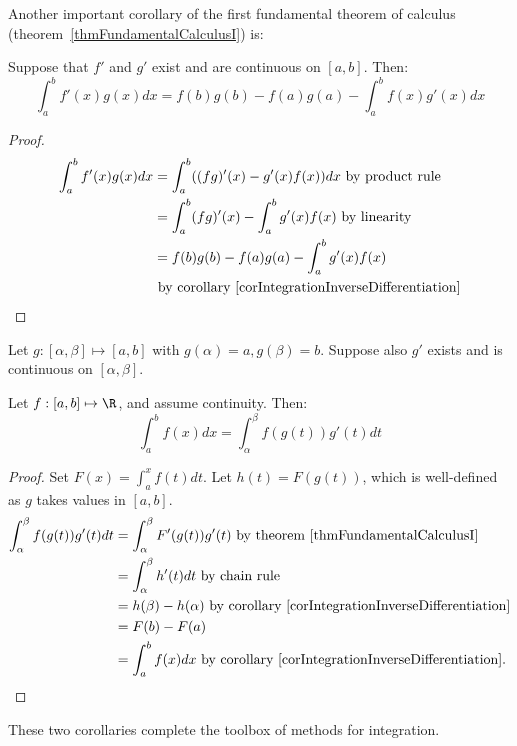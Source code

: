 \documentclass[../Main.tex]{subfiles}
\begin{document}
Another important corollary of the first fundamental theorem of calculus (theorem~\ref{thmFundamentalCalculusI}) is:
\begin{corollary}
    Suppose that $f'$ and $g'$ exist and are continuous on $[a, b]$. Then:
    \begin{equation*}
        \int_a^b f'(x) g(x) dx = f(b) g(b) - f(a) g(a) - \int_a^b f(x) g'(x) dx
    \end{equation*}
    \label{corIntegrationParts}
\end{corollary}
\begin{proof}
    \begin{align*}
        \int_a^b f'(x) g(x) dx &= \int_a^b ((fg)'(x) - g'(x) f(x))dx \text{ by product rule} \\
        &= \int_a^b (fg)'(x) - \int_a^b g'(x) f(x) \text{ by linearity} \\
        &= f(b) g(b) - f(a) g(a) - \int_a^b g'(x) f(x)\\
        &\text{ by corollary~\ref{corIntegrationInverseDifferentiation}}
    \end{align*}
\end{proof}
\begin{corollary}
    Let $g : [\alpha, \beta] \mapsto [a, b]$ with $g(\alpha) = a, g(\beta) = b$. Suppose also $g'$ exists and is continuous on $[\alpha, \beta]$.

    Let $f : [a, b] \mapsto \R$, and assume continuity. Then:
    \begin{equation*}
        \int_a^b f(x) dx = \int_\alpha^\beta f(g(t))g'(t) dt
    \end{equation*}
\end{corollary}
\begin{proof}
    Set $F(x) = \int_a^x f(t) dt$. Let $h(t) = F(g(t))$, which is well-defined as $g$ takes values in $[a, b]$.
    \begin{align*}
        \int_\alpha^\beta f(g(t)) g'(t) dt &= \int_\alpha^\beta F'(g(t)) g'(t) \text{ by theorem~\ref{thmFundamentalCalculusI}} \\
        &= \int_\alpha^\beta h'(t) dt \text{ by chain rule} \\
        &= h(\beta) - h(\alpha) \text{ by corollary~\ref{corIntegrationInverseDifferentiation}} \\
        &= F(b) - F(a) \\
        &= \int_a^b f(x) dx \text{ by corollary~\ref{corIntegrationInverseDifferentiation}.}
    \end{align*}
\end{proof}
\begin{remark}
    These two corollaries complete the toolbox of methods for integration.
\end{remark}
\end{document}
